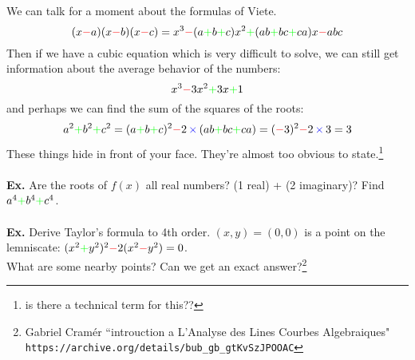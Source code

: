 \documentclass[12pt]{article}
\begin{document}
\newpage 
\noindent 
We can talk for a moment about the formulas of V{\color{blue}i}ete. 
$$ (x{\color{red}-}a)(x{\color{red}-}b)(x{\color{red}-}c) = x^3 {\color{red}-} (a{\color{green}+}b{\color{green}+}c)x^2 {\color{green}+} (ab{\color{green}+}bc{\color{green}+}ca)x {\color{red}-}abc $$
Then {\color{blue}i}f we have a cub{\color{blue}i}c equat{\color{blue}i}on wh{\color{blue}i}ch {\color{blue}i}s very d{\color{blue}i}ff{\color{blue}i}cult to solve, we can st{\color{blue}i}ll get {\color{blue}i}nformat{\color{blue}i}on about the average behav{\color{blue}i}or of the numbers:
$$ x^3 {\color{red}-} 3x^2 {\color{green}+} 3x {\color{green}+} 1$$
and perhaps we can f{\color{blue}i}nd the sum of the squares of the roots:
$$ a^2 {\color{green}+} b^2 {\color{green}+} c^2 = 
(a{\color{green}+}b{\color{green}+}c)^2 {\color{red}-} 2 {\color{blue}\,\times\,} (ab {\color{green}+} bc {\color{green}+} ca) = ({\color{red}-}3)^2 {\color{red}-} 2 {\color{blue}\,\times\,} 3 = 3 $$
These th{\color{blue}i}ngs h{\color{blue}i}de  {\color{blue}i}n front of your face.  They're almost too obv{\color{blue}i}ous to state.\footnote{{\color{blue}i}s there a techn{\color{blue}i}cal term for th{\color{blue}i}s??} \\ \\
\textbf{Ex.} Are the roots of $f(x)$ all real numbers? (1 real) {\color{green}+} (2 {\color{blue}i}mag{\color{blue}i}nary)?  F{\color{blue}i}nd $a^4 {\color{green}+} b^4 {\color{green}+} c^4$. \\ \\
\textbf{Ex.} Der{\color{blue}i}ve Taylor's formula to 4th order.  $(x,y)=(0,0)$ {\color{blue}i}s a po{\color{blue}i}nt on the lemn{\color{blue}i}scate: $(x^2 {\color{green}+} y^2)^2 {\color{red}-} 2(x^2 {\color{red}-} y^2)=0$. \\ What are some nearby po{\color{blue}i}nts?  Can we get an exact answer?\footnote{Gabr{\color{blue}i}el Cram\'{e}r ``{\color{blue}i}ntrouct{\color{blue}i}on a L'Analyse des L{\color{blue}i}nes Courbes Algebra{\color{blue}i}ques" \\ \texttt{https://arch{\color{blue}i}ve.org/deta{\color{blue}i}ls/bub\_gb\_gtKvSzJPOOAC}} 

\newpage 
\end{document}
